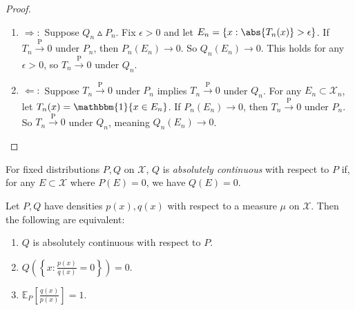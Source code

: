 \documentclass[a4paper]{article}
\begin{document}
\begin{proof} 
	\quad
	\begin{enumerate}
		\item $\Longrightarrow:$ Suppose $Q_n \vartriangle P_n$. Fix $\epsilon > 0$ and let $E_n = \{x: \abs{T_n(x)} > \epsilon\}$. If $T_n \stackrel{\text{P}}{\longrightarrow} 0$ under $P_n$, then $P_n(E_n) \to 0$. So $Q_n(E_n) \to 0$. This holds for any $\epsilon > 0$, so $T_n \stackrel{\text{P}}{\longrightarrow} 0$ under $Q_n$.
		\item $\Longleftarrow:$ Suppose $T_n \stackrel{\text{P}}{\longrightarrow} 0$ under $P_n$ implies $T_n \stackrel{\text{P}}{\longrightarrow} 0$ under $Q_n$. For any $E_n \subset \mathcal{X}_n$, let $T_n(x) = \mathbbm{1}\{x \in E_n\}$. If $P_n(E_n) \to 0$, then $T_n \stackrel{\text{P}}{\longrightarrow} 0$ under $P_n$. So $T_n \stackrel{\text{P}}{\longrightarrow} 0$ under $Q_n$, meaning $Q_n(E_n) \to 0$.
	\end{enumerate}
\end{proof}	

\begin{defi}
	For fixed distributions $P,Q$ on $\mathcal{X}$, $Q$ is \emph{absolutely continuous} with respect to $P$ if, for any $E \subset \mathcal{X}$ where $P(E) = 0$, we have $Q(E) = 0$.
\end{defi}

\begin{center}
\end{center}

\begin{prop}
	Let $P,Q$ have densities $p(x),q(x)$ with respect to a measure $\mu$
 on $\mathcal{X}$. Then the following are equivalent:
 \begin{enumerate}
 	\item $Q$ is absolutely continuous with respect to $P$.
 	\item $Q\left(\left\{x:\frac{p(x)}{q(x)} = 0\right\}\right) = 0$.
 	\item $\mathbb{E}_P\left[\frac{q(x)}{p(x)}\right] = 1$.
 \end{enumerate}
\end{prop}
\end{document}
